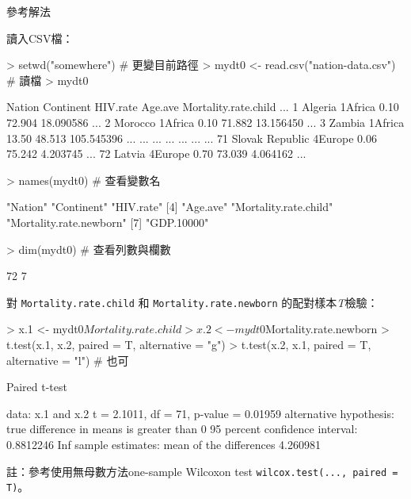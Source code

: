 \documentclass[14pt, aspectratio=43]{beamer}
\begin{document}
\begin{frame}{參考解法}

讀入CSV檔：
\begin{RC}
> setwd("somewhere") # 更變目前路徑
> mydt0 <- read.csv("nation-data.csv")  # 讀檔
> mydt0
\end{RC}
\begin{R}
            Nation Continent HIV.rate Age.ave Mortality.rate.child ...
1          Algeria   1Africa     0.10  72.904            18.090586 ...
2          Morocco   1Africa     0.10  71.882            13.156450 ...
3           Zambia   1Africa    13.50  48.513           105.545396 ...
               ...       ...      ...     ...                  ... ...
71 Slovak Republic   4Europe     0.06  75.242             4.203745 ...
72          Latvia   4Europe     0.70  73.039             4.064162 ...
\end{R}

\framebreak 

\begin{RC}
> names(mydt0)  # 查看變數名
\end{RC}
\begin{R}
[1] "Nation"     "Continent"              "HIV.rate"              
[4] "Age.ave"    "Mortality.rate.child"   "Mortality.rate.newborn"
[7] "GDP.10000" 
\end{R}
\begin{RC}
> dim(mydt0)   # 查看列數與欄數
\end{RC}
\begin{R}
[1] 72  7
\end{R}

\framebreak 

對 \verb+Mortality.rate.child+ 和 \verb+Mortality.rate.newborn+ 的配對樣本\emph{T}檢驗：
\begin{RC}
> x.1 <- mydt0$Mortality.rate.child
> x.2 <- mydt0$Mortality.rate.newborn
> t.test(x.1, x.2, paired = T, alternative = "g")
> t.test(x.2, x.1, paired = T, alternative = "l") # 也可
\end{RC}

\begin{R}
	Paired t-test

data:  x.1 and x.2
t = 2.1011, df = 71, p-value = 0.01959
alternative hypothesis: true difference in means is greater than 0
95 percent confidence interval:
 0.8812246       Inf
sample estimates:
mean of the differences 
               4.260981
\end{R}

\begin{minipage}{1\textwidth}
\tiny 註：參考使用無母數方法one-sample Wilcoxon test \verb+wilcox.test(..., paired = T)+。
\end{minipage}


\end{frame}
\end{document}
